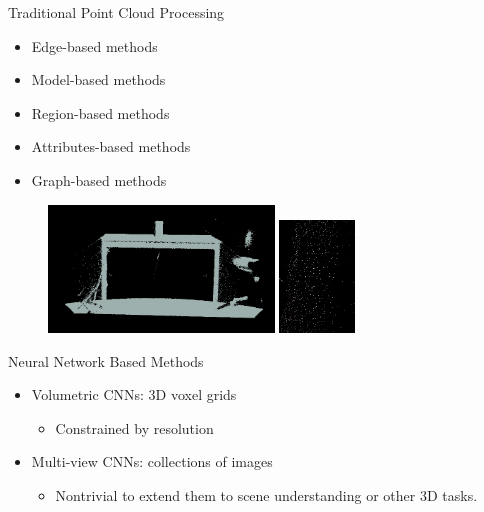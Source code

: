 \documentclass[serif,mathserif]{beamer}
\begin{document}
\begin{frame}{Traditional Point Cloud Processing}
		\begin{itemize}
			\item Edge-based methods
			\item Model-based methods
			\item Region-based methods
			\item Attributes-based methods
			\item Graph-based methods
		\end{itemize}
		\begin{figure}
			\includegraphics[width=6cm]{image/desk.png} 
			\includegraphics[width=2cm]{image/leg.png} 
		\end{figure}
	
\end{frame}

\begin{frame}{Neural Network Based Methods}
	\begin{itemize}
		\item Volumetric CNNs: 3D voxel grids
		\begin{itemize}
			\item Constrained by resolution
		\end{itemize}
		\item Multi-view CNNs: collections of images
		\begin{itemize}
			\item Nontrivial to extend them to scene understanding or other 3D tasks.
		\end{itemize}
	\end{itemize}
\end{frame}
\end{document}
